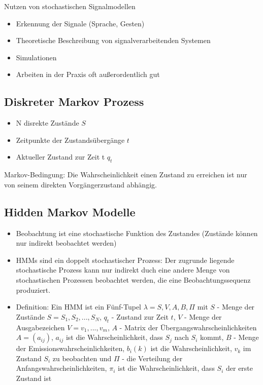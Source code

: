 \documentclass[paper=a4, fontsize=11pt]{scrartcl} %
\numberwithin{equation}{section} %
\numberwithin{figure}{section} %
\numberwithin{table}{section} %
\begin{document}
Nutzen von stochastischen Signalmodellen
\begin{itemize}
\item Erkennung der Signale (Sprache, Gesten)
\item Theoretische Beschreibung von signalverarbeitenden Systemen
\item Simulationen
\item Arbeiten in der Praxis oft außerordentlich gut
\end{itemize}

\subsection{Diskreter Markov Prozess}

\begin{itemize}
\item N disrekte Zustände $S$
\item Zeitpunkte der Zustandsübergänge $t$
\item Aktueller Zustand zur Zeit t $q_t$
\end{itemize}

Markov-Bedingung: Die Wahrscheinlichkeit einen Zustand zu erreichen ist nur von seinem direkten Vorgängerzustand abhängig.

\subsection{Hidden Markov Modelle}

\begin{itemize}
\item Beobachtung ist eine stochastische Funktion des Zustandes (Zustände können nur indirekt beobachtet werden)
\item HMMs sind ein doppelt stochastischer Prozess: Der zugrunde liegende stochastische Prozess kann nur indirekt duch eine andere Menge von stochastischen Prozessen beobachtet werden, die eine Beobachtungssequenz produziert.
\item Definition: Ein HMM ist ein Fünf-Tupel $\lambda = {S,V,A,B,\Pi}$ mit $S$ - Menge der Zustände $S = {S_1,S_2,...,S_N}$, $q_t$ - Zustand zur Zeit $t$, $V$ - Menge der Ausgabezeichen $V = {v_1,...,v_m}$, $A$ - Matrix der Übergangswahrscheinlichkeiten $A = (a_{ij})$, $a_{ij}$ ist die Wahrscheinlichkeit, dass $S_j$ nach $S_i$ kommt, $B$ - Menge der Emissionswahrscheinlichkeiten, $b_i(k)$ ist die Wahrscheinlichkeit, $v_k$ im Zustand $S_i$ zu beobachten und $\Pi$ - die Verteilung der Anfangswahrscheinlichkeiten, $\pi_i$ ist die Wahrscheinlichkeit, dass $S_i$ der erste Zustand ist
\end{itemize}
\end{document}
